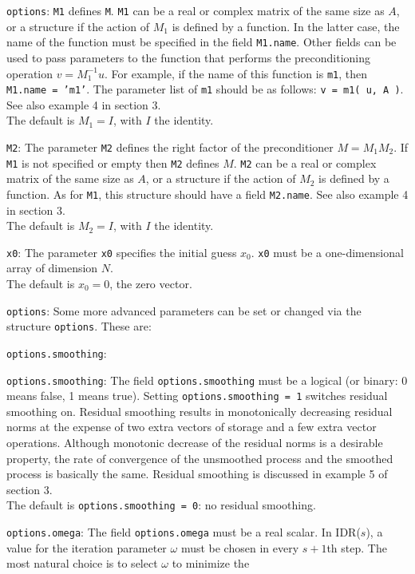 \documentclass[prodmode,acmtoms]{acmsmall}
\begin{document}
\begin{describe}{{\tt options}:}
{\tt M1} defines {\tt M}. {\tt M1} can be a real or complex matrix of the same size as 
$A$, or a structure if the action of $M_1$ is defined by a function. In the latter case, the name of the function must be specified in the field {\tt M1.name}. Other
fields can be used to pass parameters to the function that performs the preconditioning operation $v = M_1^{-1}u$.  For example, if the name of this
function is {\tt m1}, then {\tt M1.name = 'm1'}. The parameter list of {\tt m1} should be as follows: {\tt v = m1( u, A )}. See also example 4 in
section 3.\\
The default is $M_1 = I$, with $I$ the identity.
\item[{\tt M2}:] The parameter {\tt M2} defines the right factor of the preconditioner 
$M = M_1 M_2$. If {\tt M1} is not specified or empty then
{\tt M2} defines $M$. {\tt M2} can be a real or complex matrix of the same size as 
$A$, or a structure if the action of $M_2$ is defined by a function. As for {\tt M1}, this structure should have a field {\tt M2.name}. See also example 4 in section 3.\\
The default is $M_2 = I$, with $I$ the identity.
\item[{\tt x0}:] The parameter {\tt x0} specifies the initial guess $x_0$. {\tt x0} must be a one-dimensional array of dimension $N$.\\
The default is $x_0 = 0$, the zero vector. 
\item[{\tt options}:] Some more advanced parameters can be set or changed via the structure {\tt options}. These are:
\begin{describe}{{\tt options.smoothing}:}
\item[{\tt options.smoothing}:] The field {\tt options.smoothing} must be a logical (or binary: 0 means false, 1 means true). 
Setting {\tt options.smoothing = 1} switches residual smoothing on. Residual smoothing results in monotonically
decreasing residual norms at the expense of two extra vectors of storage and a few extra vector operations. Although monotonic
decrease of the residual norms is a desirable property, the rate of convergence of the unsmoothed process and the smoothed process is basically
the same. Residual smoothing is discussed in example 5 of section 3.\\
The default is {\tt options.smoothing = 0}: no residual smoothing.
\item[{\tt options.omega}:] The field {\tt options.omega} must be a real scalar. In IDR($s$), a value for the iteration parameter 
$\omega$ must be chosen in every $s+1$th step. The most natural choice is to select $\omega$ to minimize the 

\end{describe}
\end{describe}
\end{document}
